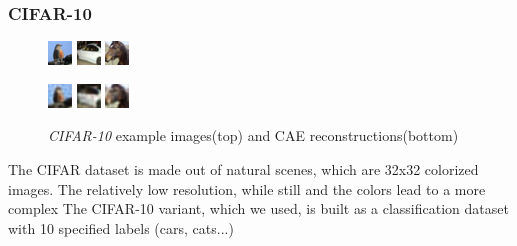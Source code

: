 \documentclass{article}
\begin{document}
    \subsubsection{CIFAR-10}
    	\begin{figure}[h]
        \centering
        \includegraphics[width=0.2\linewidth]{../graphics/reconstructions/cifar/input_00.png}
        \includegraphics[width=0.2\linewidth]{../graphics/reconstructions/cifar/input_01.png}
        \includegraphics[width=0.2\linewidth]{../graphics/reconstructions/cifar/input_02.png}

        \includegraphics[width=0.2\linewidth]{../graphics/reconstructions/cifar/reconstruction_00.png}
        \includegraphics[width=0.2\linewidth]{../graphics/reconstructions/cifar/reconstruction_01.png}
        \includegraphics[width=0.2\linewidth]{../graphics/reconstructions/cifar/reconstruction_02.png}

        \caption{\emph{CIFAR-10} example images(top) and CAE reconstructions(bottom)}

      \end{figure}
      The CIFAR dataset \citep{krizhevsky2009learning} is made out of natural scenes, which are 32x32 colorized images. The relatively low resolution, while still and the colors lead to a more complex
      The CIFAR-10 variant, which we used, is built as a classification dataset with 10 specified labels (cars, cats...)
\end{document}
